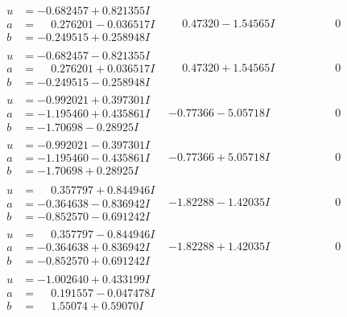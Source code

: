 \documentclass[1p]{elsarticle_modified}
\theoremstyle{definition}
\begin{document}
$$\begin{array}{c|c|c}
 \hline 
\begin{aligned}
u &= -0.682457 + 0.821355 I \\
a &= \phantom{-}0.276201 - 0.036517 I \\
b &= -0.249515 + 0.258948 I\end{aligned}
 & \phantom{-}0.47320 - 1.54565 I & \phantom{-0.000000 } 0 \\ \hline\begin{aligned}
u &= -0.682457 - 0.821355 I \\
a &= \phantom{-}0.276201 + 0.036517 I \\
b &= -0.249515 - 0.258948 I\end{aligned}
 & \phantom{-}0.47320 + 1.54565 I & \phantom{-0.000000 } 0 \\ \hline\begin{aligned}
u &= -0.992021 + 0.397301 I \\
a &= -1.195460 + 0.435861 I \\
b &= -1.70698 - 0.28925 I\end{aligned}
 & -0.77366 - 5.05718 I & \phantom{-0.000000 } 0 \\ \hline\begin{aligned}
u &= -0.992021 - 0.397301 I \\
a &= -1.195460 - 0.435861 I \\
b &= -1.70698 + 0.28925 I\end{aligned}
 & -0.77366 + 5.05718 I & \phantom{-0.000000 } 0 \\ \hline\begin{aligned}
u &= \phantom{-}0.357797 + 0.844946 I \\
a &= -0.364638 - 0.836942 I \\
b &= -0.852570 - 0.691242 I\end{aligned}
 & -1.82288 - 1.42035 I & \phantom{-0.000000 } 0 \\ \hline\begin{aligned}
u &= \phantom{-}0.357797 - 0.844946 I \\
a &= -0.364638 + 0.836942 I \\
b &= -0.852570 + 0.691242 I\end{aligned}
 & -1.82288 + 1.42035 I & \phantom{-0.000000 } 0 \\ \hline\begin{aligned}
u &= -1.002640 + 0.433199 I \\
a &= \phantom{-}0.191557 - 0.047478 I \\
b &= \phantom{-}1.55074 + 0.59070 I\end{aligned}

\end{array}$$
\end{document}
